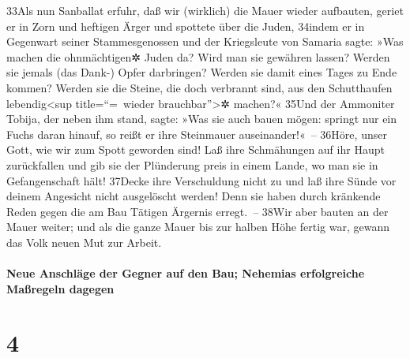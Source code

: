33Als nun Sanballat erfuhr, daß wir (wirklich) die Mauer wieder
aufbauten, geriet er in Zorn und heftigen Ärger und spottete über die
Juden, 34indem er in Gegenwart seiner Stammesgenossen und der
Kriegsleute von Samaria sagte: »Was machen die ohnmächtigen✲ Juden da?
Wird man sie gewähren lassen? Werden sie jemals (das Dank-) Opfer
darbringen? Werden sie damit eines Tages zu Ende kommen? Werden sie die
Steine, die doch verbrannt sind, aus den Schutthaufen
lebendig\textless sup title=``=~wieder brauchbar''\textgreater✲ machen?«
35Und der Ammoniter Tobija, der neben ihm stand, sagte: »Was sie auch
bauen mögen: springt nur ein Fuchs daran hinauf, so reißt er ihre
Steinmauer auseinander!«~-- 36Höre, unser Gott, wie wir zum Spott
geworden sind! Laß ihre Schmähungen auf ihr Haupt zurückfallen und gib
sie der Plünderung preis in einem Lande, wo man sie in Gefangenschaft
hält! 37Decke ihre Verschuldung nicht zu und laß ihre Sünde vor deinem
Angesicht nicht ausgelöscht werden! Denn sie haben durch kränkende Reden
gegen die am Bau Tätigen Ärgernis erregt.~-- 38Wir aber bauten an der
Mauer weiter; und als die ganze Mauer bis zur halben Höhe fertig war,
gewann das Volk neuen Mut zur Arbeit.

\hypertarget{neue-anschluxe4ge-der-gegner-auf-den-bau-nehemias-erfolgreiche-mauxdfregeln-dagegen}{%
\paragraph{Neue Anschläge der Gegner auf den Bau; Nehemias erfolgreiche
Maßregeln
dagegen}\label{neue-anschluxe4ge-der-gegner-auf-den-bau-nehemias-erfolgreiche-mauxdfregeln-dagegen}}

\hypertarget{section-3}{%
\section{4}\label{section-3}}

